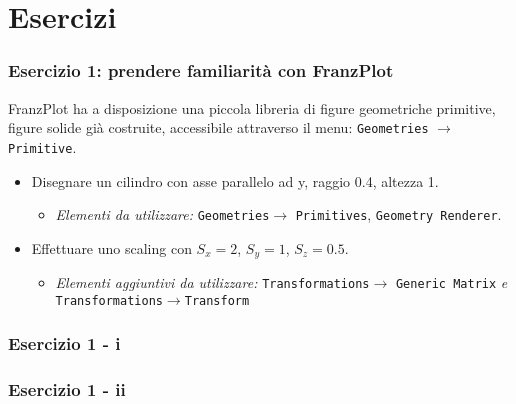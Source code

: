 \documentclass{beamer}
\newcommand{\fig}{figures}
\newcommand{\frnzplt}{FranzPlot }
\begin{document}
\section{Esercizi}
\begin{frame}
\frametitle{Esercizio 1: prendere familiarit\`a con \frnzplt}
\frnzplt ha a disposizione una piccola libreria di figure geometriche primitive, figure solide gi\`a costruite, accessibile attraverso il menu: \texttt{Geometries} $\rightarrow$\texttt{Primitive}.
\begin{itemize}
\item Disegnare un cilindro con asse parallelo ad y, raggio 0.4, altezza 1.
\begin{itemize}
\item \textit{Elementi da utilizzare:} \texttt{Geometries}$\rightarrow$ \texttt{Primitives}, \texttt{Geometry Renderer}.
\end{itemize}
\item Effettuare uno scaling con $S_x =2$, $S_y=1$, $S_z=0.5$.
\begin{itemize}
\item \textit{Elementi aggiuntivi da utilizzare:} \texttt{Transformations}$\rightarrow$ \texttt{Generic Matrix} \textit{e} \texttt{Transformations}$\rightarrow$\texttt{Transform}
\end{itemize}
\end{itemize}
\end{frame}
\begin{frame}
\frametitle{Esercizio 1 - i}
\begin{center}
\end{center}
\end{frame}
\begin{frame}
\frametitle{Esercizio 1 - ii}
\begin{center}
\end{center}
\end{frame}
\end{document}
